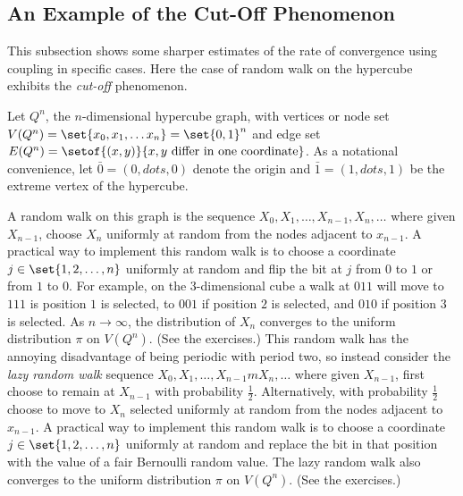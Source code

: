 \documentclass[12pt]{article}
\begin{document}
\subsection*{An Example of the Cut-Off Phenomenon}


This subsection shows some sharper estimates of the rate of convergence
using coupling in specific cases.  Here the case of random walk on the
hypercube exhibits the \emph{cut-off} phenomenon.%

Let \( Q^n \), the \( n \)-dimensional hypercube graph, with vertices or
node set \( V(Q^n) = \set{x_0, x_1, \dots x_n} = \set{0,1}^n \) and edge
set \( E(Q^n) = \setof{(x,y)}{x, y \text{ differ in one coordinate}} \).%
As a notational convenience, let \( \bar{0} = (0, dots, 0) \) denote the
origin and \( \bar{1} = (1, dots, 1) \) be the extreme vertex of the
hypercube.

A random walk on this graph is the sequence \( X_0, X_1, \dots, X_{n-1},
X_n, \dots \) where given \( X_{n-1} \), choose \( X_n \) uniformly at
random from the nodes adjacent to \( x_{n-1} \).%
A practical way to implement this random walk is to choose a coordinate \(
j \in \set{1,2, \dots, n} \) uniformly at random and flip the bit at \(
j \) from \( 0 \) to \( 1 \) or from \( 1 \) to \( 0 \).  For example,
on the \( 3 \)-dimensional cube a walk at \( 011 \) will move to \( 111 \)
is position \( 1 \) is selected, to \( 001 \) if position \( 2 \) is
selected, and \( 010 \) if position \( 3 \) is selected. As \( n \to
\infty \), the distribution of \( X_n \) converges to the uniform
distribution \( \pi \) on \( V(Q^n) \).  (See the exercises.) This
random walk has the annoying disadvantage of being periodic with period
two, so instead consider the \emph{lazy random walk}%
sequence \( X_0, X_1, \dots, X_{n-1}m X_n, \dots \) where given \( X_{n-1}
\), first choose to remain at \( X_{n-1} \) with probability \( \frac{1}
{2} \).  Alternatively, with probability \( \frac{1}{2} \) choose to
move to \( X_n \) selected uniformly at random from the nodes adjacent
to \( x_{n-1} \).  A practical way to implement this random walk is to
choose a coordinate \( j \in \set{1,2, \dots, n} \) uniformly at random
and replace the bit in that position with the value of a fair Bernoulli
random value. The lazy random walk also converges to the uniform
distribution \( \pi \) on \( V(Q^n) \).  (See the exercises.)
\end{document}
